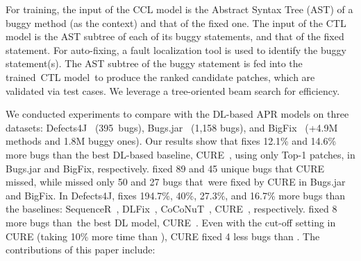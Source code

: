 For training, the input of the CCL model is the Abstract Syntax Tree
(AST) of a buggy method (as the context) and that of the fixed one.
The input of the CTL model is the AST subtree of each of its buggy
statements, and that of the fixed statement. For
auto-fixing, a fault localization tool is used to identify the buggy
statement(s). The AST subtree of the buggy statement is fed into the
trained~CTL model~to produce the ranked candidate patches, which are
validated via test cases. We leverage a tree-oriented beam search for
efficiency.


We conducted experiments to compare {\tool} with the DL-based APR
models on three datasets: Defects4J~\cite{defects4j} (395~bugs),
Bugs.jar~\cite{saha2018bugs} (1,158 bugs), and
BigFix~\cite{yioopsla19} (+4.9M methods and 1.8M buggy ones). Our
results show that {\tool} fixes 12.1\% and 14.6\% more bugs than the
best DL-based baseline, CURE~\cite{cure-icse21}, using only Top-1
patches, in Bugs.jar and BigFix, respectively.
{\tool} fixed 89 and 45 unique bugs that CURE missed, while {\tool}
missed only 50 and 27 bugs that~were fixed by CURE in Bugs.jar and
BigFix. In Defects4J, {\tool} fixes 194.7\%, 40\%, 27.3\%, and 16.7\%
more bugs than the baselines: SequenceR~\cite{chen2018sequencer},
DLFix~\cite{icse20}, CoCoNuT~\cite{lutellier2020coconut},
CURE~\cite{cure-icse21}, respectively. {\tool} fixed 8 more bugs
than~the best DL model, CURE~\cite{cure-icse21}. Even with the
cut-off setting in CURE (taking 10\% more time than {\tool}), CURE
fixed 4 less bugs than {\tool}. The contributions of this paper
include:


